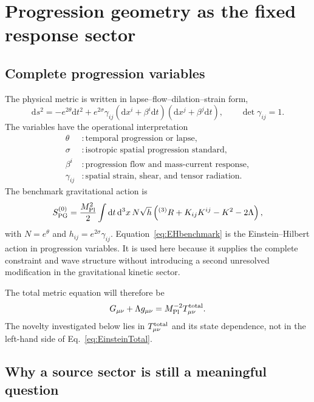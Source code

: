 \documentclass[11pt]{article}
\newcommand{\dd}{\mathrm{d}}
\newcommand{\Mpl}{M_{\rm Pl}}
\newcommand{\Rthree}{{}^{(3)}R}
\begin{document}
\section{Progression geometry as the fixed response sector}

\subsection{Complete progression variables}

The physical metric is written in lapse--flow--dilation--strain form,
\begin{equation}
\dd s^2=-e^{2\theta}\dd t^2
+e^{2\sigma}\gamma_{ij}
(\dd x^i+\beta^i\dd t)(\dd x^j+\beta^j\dd t),
\qquad \det\gamma_{ij}=1.
\label{eq:progressionmetric}
\end{equation}
The variables have the operational interpretation
\begin{align}
\theta &: \text{temporal progression or lapse},\nonumber\\
\sigma &: \text{isotropic spatial progression standard},\nonumber\\
\beta^i &: \text{progression flow and mass-current response},\nonumber\\
\gamma_{ij} &: \text{spatial strain, shear, and tensor radiation}.
\end{align}
The benchmark gravitational action is
\begin{equation}
S_{\rm PG}^{(0)}=
\frac{\Mpl^2}{2}
\int \dd t\,\dd^3x\,N\sqrt h
\left(\Rthree+K_{ij}K^{ij}-K^2-2\Lambda\right),
\label{eq:EHbenchmark}
\end{equation}
with $N=e^\theta$ and $h_{ij}=e^{2\sigma}\gamma_{ij}$.  Equation~\eqref{eq:EHbenchmark} is the Einstein--Hilbert action in progression variables.  It is used here because it supplies the complete constraint and wave structure without introducing a second unresolved modification in the gravitational kinetic sector.

The total metric equation will therefore be
\begin{equation}
G_{\mu\nu}+\Lambda g_{\mu\nu}
=\Mpl^{-2}T_{\mu\nu}^{\rm total}.
\label{eq:EinsteinTotal}
\end{equation}
The novelty investigated below lies in $T_{\mu\nu}^{\rm total}$ and its state dependence, not in the left-hand side of Eq.~\eqref{eq:EinsteinTotal}.

\subsection{Why a source sector is still a meaningful question}
\end{document}
